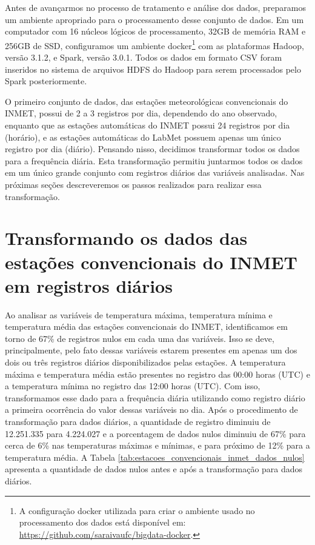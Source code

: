 Antes de avançarmos no processo de tratamento e análise dos dados, preparamos um ambiente apropriado para o processamento desse conjunto de dados. 
Em um computador com 16 núcleos lógicos de processamento, 32GB de memória RAM e 256GB de SSD, configuramos um ambiente docker\footnote{A configuração docker utilizada para criar o ambiente usado no processamento dos dados está disponível em: \href{https://github.com/saraivaufc/bigdata-docker}{https://github.com/saraivaufc/bigdata-docker}.} com as plataformas Hadoop, versão 3.1.2, e Spark, versão 3.0.1. Todos os dados em formato CSV foram inseridos no sistema de arquivos HDFS do Hadoop para serem processados pelo Spark posteriormente.  

O primeiro conjunto de dados, das estações meteorológicas convencionais do INMET, possui de 2 a 3 registros por dia, dependendo do ano observado, enquanto que as estações automáticas do INMET possui 24 registros por dia (horário), e as estações automáticas do LabMet possuem apenas um único registro por dia (diário). Pensando nisso, decidimos transformar todos os dados para a frequência diária. Esta transformação permitiu juntarmos todos os dados em um único grande conjunto com registros diários das variáveis analisadas. Nas próximas seções descreveremos os passos realizados para realizar essa transformação. 

\section{Transformando os dados das estações convencionais do INMET em registros diários}

Ao analisar as variáveis de temperatura máxima, temperatura mínima e temperatura média das estações convencionais do INMET, identificamos em torno de 67\% de registros nulos em cada uma das variáveis. Isso se deve, principalmente, pelo fato dessas variáveis estarem presentes em apenas um dos dois ou três registros diários disponibilizados pelas estações. A temperatura máxima e temperatura média estão presentes no registro das 00:00 horas (UTC) e a temperatura mínima no registro das 12:00 horas (UTC). Com isso, transformamos esse dado para a frequência diária utilizando como registro diário a primeira ocorrência do valor dessas variáveis no dia. Após o procedimento de transformação para dados diários, a quantidade de registro diminuiu de 12.251.335 para 4.224.027 e a porcentagem de dados nulos diminuiu de 67\% para cerca de 6\% nas temperaturas máximas e mínimas, e para próximo de 12\% para a temperatura média. A Tabela \ref{tab:estacoes_convencionais_inmet_dados_nulos} apresenta a quantidade de dados nulos antes e após a transformação para dados diários.  

